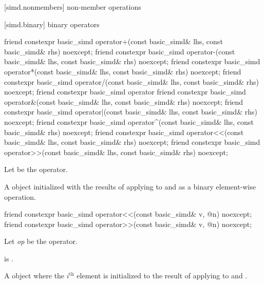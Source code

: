 [simd.nonmembers]{ non-member operations}

[simd.binary]{ binary operators}

\begin{itemdecl}
friend constexpr basic_simd operator+(const basic_simd& lhs, const basic_simd& rhs) noexcept;
friend constexpr basic_simd operator-(const basic_simd& lhs, const basic_simd& rhs) noexcept;
friend constexpr basic_simd operator*(const basic_simd& lhs, const basic_simd& rhs) noexcept;
friend constexpr basic_simd operator/(const basic_simd& lhs, const basic_simd& rhs) noexcept;
friend constexpr basic_simd operator%
friend constexpr basic_simd operator&(const basic_simd& lhs, const basic_simd& rhs) noexcept;
friend constexpr basic_simd operator|(const basic_simd& lhs, const basic_simd& rhs) noexcept;
friend constexpr basic_simd operator^(const basic_simd& lhs, const basic_simd& rhs) noexcept;
friend constexpr basic_simd operator<<(const basic_simd& lhs, const basic_simd& rhs) noexcept;
friend constexpr basic_simd operator>>(const basic_simd& lhs, const basic_simd& rhs) noexcept;
\end{itemdecl}

\begin{itemdescr}
  \pnum Let \op{} be the operator.

  \pnum\ConstraintOperatorTWellFormed

  \pnum\returns
  A  object initialized with the results of applying \op{} to  and
   as a binary element-wise operation.
\end{itemdescr}

\begin{itemdecl}
friend constexpr basic_simd operator<<(const basic_simd& v, @\simdsizetype@ n) noexcept;
friend constexpr basic_simd operator>>(const basic_simd& v, @\simdsizetype@ n) noexcept;
\end{itemdecl}

\begin{itemdescr}
  \pnum Let \textit{op} be the operator.

  \pnum\constraints
   is .

  \pnum\returns
  A  object where the $i^\text{th}$ element is initialized to the result of
  applying \op{} to  and  \foralli.
\end{itemdescr}

